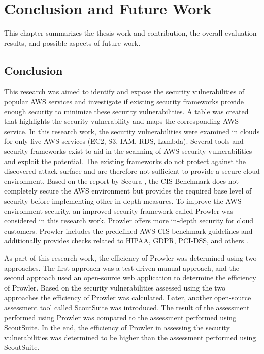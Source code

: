 
\chapter{Conclusion and Future Work}

\par This chapter summarizes the thesis work and contribution, the overall evaluation results, and possible aspects of future work.

\section{Conclusion}

\par This research was aimed to identify and expose the security vulnerabilities of popular AWS services and investigate if existing security frameworks provide enough security to minimize these security vulnerabilities.
A table was created that highlights the security vulnerability and maps the corresponding AWS service.
In this research work, the security vulnerabilities were examined in clouds for only five AWS services (EC2, S3, IAM, RDS, Lambda).
Several tools and security frameworks exist to aid in the scanning of AWS security vulnerabilities and exploit the potential.
The existing frameworks do not protect against the discovered attack surface and are therefore not sufficient to provide a secure cloud environment.
Based on the report by Secura \cite{98}, the CIS Benchmark does not completely secure the AWS environment but provides the required base level of security before implementing other in-depth measures.
To improve the AWS environment security, an improved security framework called Prowler was considered in this research work.
Prowler offers more in-depth security for cloud customers.
Prowler includes the predefined AWS CIS benchmark guidelines and additionally provides checks related to HIPAA, GDPR, PCI-DSS, and others \cite{75}.

\par As part of this research work, the efficiency of Prowler was determined using two approaches.
The first approach was a test-driven manual approach, and the second approach used an open-source web application to determine the efficiency of Prowler.
Based on the security vulnerabilities assessed using the two approaches the efficiency of Prowler was calculated.
Later, another open-source assessment tool called ScoutSuite was introduced.
The result of the assessment performed using Prowler was compared to the assessment performed using ScoutSuite.
In the end, the efficiency of Prowler in assessing the security vulnerabilities was determined to be higher than the assessment performed using ScoutSuite.


